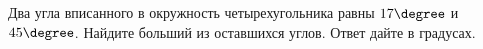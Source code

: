 \begin{ex}
	\begin{condition}
		Два угла вписанного в окружность четырехугольника равны \( 17\degree \) и \( 45  \degree\). Найдите больший из оставшихся углов. Ответ дайте в градусах.
	\end{condition}
\end{ex}